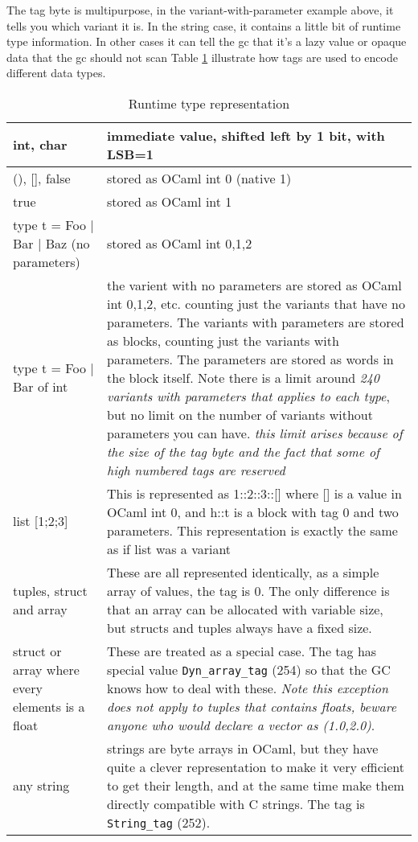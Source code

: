 The tag byte is multipurpose, in the variant-with-parameter example
above, it tells you which variant it is. In the string case, it
contains a little bit of runtime type information. In other cases it
can tell the gc that it's a lazy value or opaque data that the gc
should not scan
Table \ref{tab:run_time_rr} illustrate how tags are used to encode
different data types.
\begin{table}
  \centering
  \begin{tabular}{|p{3cm}|p{12cm}|}
    \hline 
    int, char & immediate value, shifted left by 1 bit, with LSB=1\\
    \hline 
    (), [], false & stored as OCaml int 0 (native 1) \\
    \hline 
    true & stored as OCaml int 1 \\
    \hline 
    type t = Foo | Bar | Baz
    (no parameters)  & stored as OCaml int 0,1,2 \\
    \hline 
    type t = Foo | Bar of int & the varient with no parameters are stored
    as OCaml int 0,1,2, etc. counting just the variants that have no parameters.
    The variants with parameters are stored as blocks, counting just the variants with
    parameters. The parameters are stored as words in the block itself. Note there is
    a limit around \textit{ 240 variants with parameters that applies to each type},
    but no limit on the number of variants without parameters you can have. \textit{this limit
      arises because of the size of the tag byte and the fact that some of high numbered tags are reserved} \\
    \hline 
    list [1;2;3] & This is represented as 1::2::3::[] where [] is a value in OCaml int 0,
    and h::t is a block with tag 0 and two parameters. This representation is exactly
    the same as if list was a variant \\
    \hline 
    tuples, struct and array & These are all represented identically, as a simple
    array of values, the tag is 0. The only difference is that an array can be allocated
    with variable size, but structs and tuples always have a fixed size.
    \\
    \hline
    struct or array where every elements is a float & These are treated as a special case.
    The tag has special value \verb|Dyn_array_tag| (254) so that the GC knows how to deal with
    these. \textit{ Note this exception does not apply to tuples that contains floats, beware
      anyone who would declare a vector as (1.0,2.0)}. \\
    \hline
    any string & strings are byte arrays in OCaml, but they have quite
    a clever representation to make it very efficient
    to get their length, and at the same time make them directly
    compatible with C strings. The tag is \verb|String_tag| (252).
    \\
    \hline 
  \end{tabular}
  \caption{Runtime type representation}
  \label{tab:run_time_rr}
\end{table}

